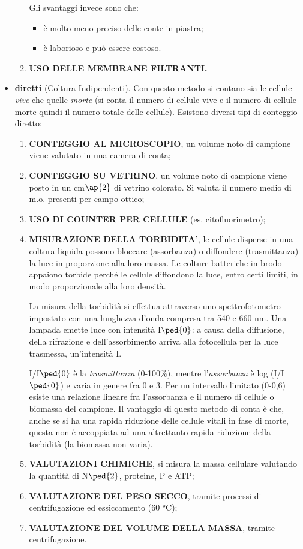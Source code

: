 \documentclass[11pt]{book}
\begin{document}
\begin{itemize}
\begin{enumerate}
Gli svantaggi invece sono che:
\begin{itemize}
\item è molto meno preciso delle conte in piastra;
\item  è laborioso e può essere costoso.
\end{itemize}

\item \textbf{USO DELLE MEMBRANE FILTRANTI.}
\end{enumerate}


\item \textbf{diretti} (Coltura-Indipendenti). Con questo metodo si contano sia le cellule \emph{vive} che quelle \emph{morte} (si conta il numero di cellule vive e il numero di cellule morte quindi il numero totale delle cellule). Esistono diversi tipi di conteggio diretto:
\begin{enumerate} 
\item \textbf{CONTEGGIO AL MICROSCOPIO}, un volume noto di campione viene valutato in una camera di conta;
\item \textbf{CONTEGGIO SU VETRINO}, un volume noto di campione viene posto in un cm$\ap{2}$ di vetrino colorato. Si valuta il numero medio di m.o. presenti per campo ottico;
\item \textbf{USO DI COUNTER PER CELLULE} (es. citofluorimetro);
\item \textbf{MISURAZIONE DELLA TORBIDITA’}, le cellule disperse in una coltura liquida possono bloccare (assorbanza) o diffondere (trasmittanza) la luce in proporzione alla loro massa. Le colture batteriche in brodo appaiono torbide perché le cellule diffondono la luce, entro certi limiti, in modo proporzionale alla loro densità.

La misura della torbidità si effettua attraverso uno spettrofotometro impostato con una lunghezza d’onda compresa tra 540 e 660 nm.
Una lampada emette luce con intensità I$\ped{0}$: a causa della diffusione, della rifrazione e dell’assorbimento arriva alla fotocellula per la luce trasmessa, un’intensità I.

I/I$\ped{0}$ è la \emph{trasmittanza} (0-100$\%$), mentre l’\emph{assorbanza} è log (I/I$\ped{0}$) e varia in genere fra 0 e 3. Per un intervallo limitato (0-0,6) esiste una relazione lineare fra l'assorbanza e il numero di cellule o biomassa del campione.
Il vantaggio di questo metodo di conta è che, anche se si ha una rapida riduzione delle cellule vitali in fase di morte, questa non è accoppiata ad una altrettanto rapida riduzione della torbidità (la biomassa non varia).
\item \textbf{VALUTAZIONI CHIMICHE}, si misura la massa cellulare valutando la quantità di N$\ped{2}$, proteine, P e ATP;
\item \textbf{VALUTAZIONE DEL PESO SECCO}, tramite processi di centrifugazione ed essiccamento (60 °C);
\item \textbf{VALUTAZIONE DEL VOLUME DELLA MASSA}, tramite centrifugazione.
\end{enumerate}

\end{itemize}
\end{document}
